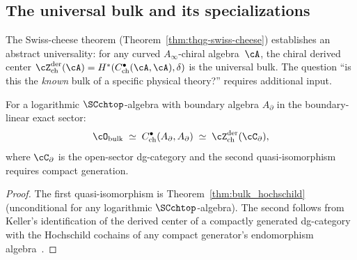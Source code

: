 %

\subsection{The universal bulk and its specializations}
\label{subsec:universal-bulk-specializations}

The Swiss-cheese theorem
(Theorem~\ref{thm:thqg-swiss-cheese})
establishes an abstract universality: for any curved
$A_\infty$-chiral algebra~$\cA$, the chiral derived center
$\cZ^{\mathrm{der}}_{\mathrm{ch}}(\cA)
= H^*(C^\bullet_{\mathrm{ch}}(\cA, \cA), \delta)$
is the universal bulk. The question ``is this the \emph{known}
bulk of a specific physical theory?'' requires additional input.

\begin{proposition}
\label{prop:bulk-specialization-boundary-linear}
For a logarithmic $\SCchtop$-algebra with boundary algebra
$A_\partial$ in the boundary-linear exact sector:
\[
 \cO_{\mathrm{bulk}}
 \;\simeq\;
 C^\bullet_{\mathrm{ch}}(A_\partial, A_\partial)
 \;\simeq\;
 \cZ^{\mathrm{der}}_{\mathrm{ch}}(\cC_\partial),
\]
where $\cC_\partial$ is the open-sector dg-category and the
second quasi-isomorphism requires compact generation.
\end{proposition}

\begin{proof}
The first quasi-isomorphism is
Theorem~\ref{thm:bulk_hochschild} (unconditional for any
logarithmic $\SCchtop$-algebra). The second follows from
Keller's identification of the derived center of a compactly
generated dg-category with the Hochschild cochains of any compact
generator's endomorphism algebra~\cite{Kel06}.
\end{proof}

